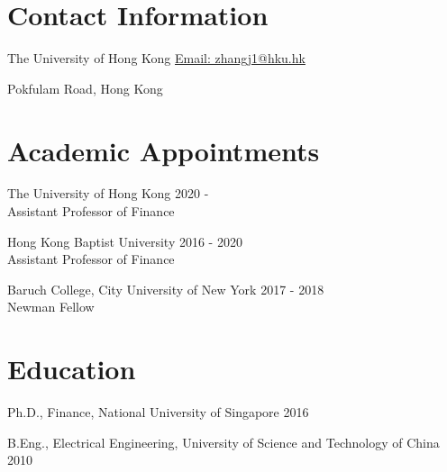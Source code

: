 \documentclass[margin,line]{res}
\newenvironment{list1}{
  \begin{list}{\ding{113}}{%
      \setlength{\itemsep}{0in}
      \setlength{\parsep}{0in} \setlength{\parskip}{0in}
      \setlength{\topsep}{0in} \setlength{\partopsep}{0in} 
      \setlength{\leftmargin}{0.17in}}}{\end{list}}
\begin{document}

\begin{resume}
\thispagestyle{plain} %

\section{\sc Contact Information}
\begin{list1}
	\item[] The University of Hong Kong \hfill \href{mailto: zhangj1@hku.hk}{Email: \color{blue} zhangj1@hku.hk}\\
	\vspace*{-.15in}
	\item[] Pokfulam Road, Hong Kong
\end{list1}

\section{\sc Academic Appointments}
\begin{list1}
	\item[] The University of Hong Kong 
	\hfill 2020 -  \\
	\vspace*{.2cm}
	\phantom{th} Assistant Professor of Finance		
	\item[] Hong Kong Baptist University
	\hfill 2016 - 2020 \\
	\vspace*{.2cm}
	\phantom{th} Assistant Professor of Finance	
	\item[] Baruch College, City University of New York
	\hfill 2017 - 2018\\
	\vspace*{.2cm}
	\phantom{th} Newman Fellow	
\end{list1}

\section{\sc Education}
\begin{list1}
	\item[] Ph.D., Finance, National University of Singapore \hfill 2016 
\\
	\vspace*{-.1in}
	\item[] B.Eng., Electrical Engineering, University of Science and Technology of China \hfill 2010
\end{list1}


\end{resume}
\end{document}
